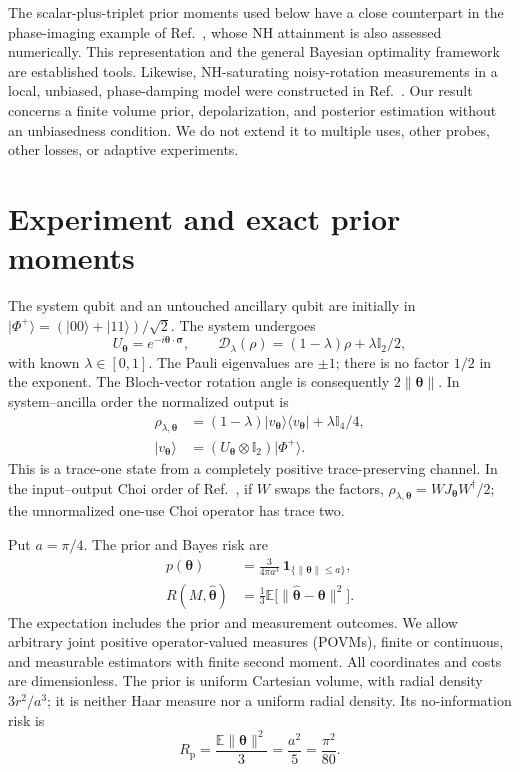 \documentclass[aps,pra,reprint,amsmath,amssymb,nofootinbib,longbibliography,floatfix]{revtex4-2}
\newcommand{\ket}[1]{\lvert #1\rangle}
\newcommand{\bra}[1]{\langle #1\rvert}
\newcommand{\I}{\mathbb{I}}
\newcommand{\thv}{\bm{\theta}}
\newcommand{\est}{\hat{\bm{\theta}}}
\begin{document}
The scalar-plus-triplet prior moments used below have a close counterpart
in the phase-imaging example of Ref.~\cite{Albarelli2026}, whose NH
attainment is also assessed numerically. This representation and the
general Bayesian optimality framework are established tools. Likewise,
NH-saturating noisy-rotation measurements in a local, unbiased,
phase-damping model were constructed in Ref.~\cite{Conlon2021}.
Our result concerns a finite volume prior, depolarization, and posterior
estimation without an unbiasedness condition. We do not extend it to
multiple uses, other probes, other losses, or adaptive experiments.

\section{Experiment and exact prior moments}
The system qubit and an untouched ancillary qubit are initially in
$\ket{\Phi^+}=(\ket{00}+\ket{11})/\sqrt2$. The system undergoes
\begin{equation}
 U_{\thv}=e^{-i\thv\cdot\bm{\sigma}},\qquad
 \mathcal D_\lambda(\rho)=(1-\lambda)\rho+\lambda\I_2/2,
 \label{eq:channel}
\end{equation}
with known $\lambda\in[0,1]$. The Pauli eigenvalues are $\pm1$;
there is no factor $1/2$ in the exponent. The Bloch-vector rotation
angle is consequently $2\|\thv\|$. In system--ancilla order the
normalized output is
\begin{align}
 \rho_{\lambda,\thv}&=(1-\lambda)\ket{v_{\thv}}\bra{v_{\thv}}
                  +\lambda\I_4/4,\label{eq:state}\\
 \ket{v_{\thv}}&=(U_{\thv}\otimes\I_2)\ket{\Phi^+}.
\end{align}
This is a trace-one state from a completely positive trace-preserving
channel. In the input--output Choi order of Ref.~\cite{Bia2026}, if $W$
swaps the factors, $\rho_{\lambda,\thv}=WJ_{\thv}W^\dagger/2$;
the unnormalized one-use Choi operator has trace two.

Put $a=\pi/4$. The prior and Bayes risk are
\begin{align}
 p(\thv)&=\frac{3}{4\pi a^3}\,\mathbf1_{\{\|\thv\|\leq a\}},
                  \label{eq:prior}\\
 R(M,\est)&=\frac13\mathbb E\bigl[\|\est-\thv\|^2\bigr].
                  \label{eq:risk}
\end{align}
The expectation includes the prior and measurement outcomes. We allow
arbitrary joint positive operator-valued measures (POVMs), finite or
continuous, and measurable estimators with finite second moment.
All coordinates and costs are dimensionless. The prior is uniform
Cartesian volume, with radial density $3r^2/a^3$; it is neither Haar
measure nor a uniform radial density. Its no-information risk is
\begin{equation}
 R_{\mathrm p}=\frac{\mathbb E\|\thv\|^2}{3}
             =\frac{a^2}{5}=\frac{\pi^2}{80}.
 \label{eq:priorrisk}
\end{equation}
\end{document}
